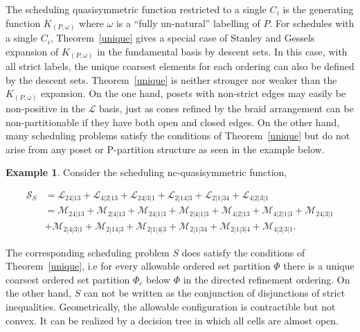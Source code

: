 \documentclass[12pt,reqno]{amsart}
\numberwithin{definition}{section}
\theoremstyle{definition}
\newtheorem{example}[definition]{Example}
\newcommand{\SSS}{\mathcal{S}}
\newcommand{\ncM}{\mathcal{M}}
\newcommand{\ncL}{\mathcal{L}}
\begin{document}
The scheduling quasisymmetric function
 restricted to a single $C_{i}$ is the generating function
$K_{(P,\omega)}$ where $\omega$ is a ``fully un-natural'' labelling of
$P$. For schedules with a single $C_{i}$, Theorem~\ref{unique}
gives a special case of Stanley and Gessels~\cite{Gessel,StanP} 
expansion of $K_{(P,\omega)}$ in the fundamental basis by descent
sets.  In this case, with all strict labels, the unique coarsest
elements for each ordering can also be defined by the descent sets.
Theorem~\ref{unique} is neither  stronger nor weaker than the
$K_{(P,\omega)}$ expansion.  
On the one hand, posets with non-strict edges may easily be non-positive in the $\ncL$ basis, just as cones refined by the braid arrangement can be non-partitionable if they have both open and closed edges. 
On the other hand, many scheduling problems satisfy the conditions of Theorem~\ref{unique} but do not arise from any poset or P-partition structure as seen in the example below.

\begin{example} 
Consider the scheduling nc-quasisymmetric function,

\begin{align*}
\SSS_S & = \ncL_{24|13} + \ncL_{4|2|13} + \ncL_{24|3|1} + \ncL_{2|14|3} + \ncL_{2|1|34} + \ncL_{4|2|3|1}\\
& = \ncM_{24|13} + \ncM_{2|4|13} + \ncM_{24|1|3} + \ncM_{2|4|1|3} + \ncM_{4|2|13} + \ncM_{4|2|1|3} + \ncM_{24|3|1}\\
& + \ncM_{2|4|3|1} + \ncM_{2|14|3} + \ncM_{2|1|4|3} + \ncM_{2|1|34} + \ncM_{2|1|3|4} + \ncM_{4|2|3|1}.
\end{align*}

The corresponding scheduling problem $S$ does satisfy the conditions of Theorem~\ref{unique}, i.e for every allowable ordered set partition $\Phi$ there is a unique coarsest ordered set partition $\Phi_c$ below $\Phi$ in the directed refinement ordering.  On the other hand, $S$ can not be written as the conjunction of disjunctions of strict inequalities. Geometrically, the allowable configuration is contractible but not convex. It can be realized by a decision tree in which all cells are almost open.


\end{example}




\end{document}
